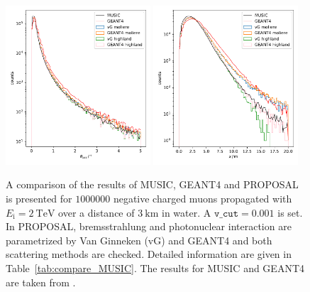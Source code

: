 \documentclass[pdflatex, sn-mathphys]{sn-jnl}%
\theoremstyle{thmstyleone}%
\theoremstyle{thmstyletwo}%
\theoremstyle{thmstylethree}%
\begin{document}
\begin{figure}
    \centering
        {\includegraphics[width=0.48\textwidth]{../../deflection/plots/FINAL/2TeV_1e6events_accumulated_defl_only3km_5deg_paper.pdf}}
        {\includegraphics[width=0.48\textwidth]{../../deflection/plots/FINAL/2TeV_1e6events_distance_showeraxis_only3km_20m_paper.pdf}}
    \caption{A comparison of the results of MUSIC, GEANT4 and PROPOSAL is presented for $\num{1000000}$ negative charged muons propagated with 
    $E_{\text{i}} = \SI{2}{\tera\electronvolt}$ over a distance of 
    $\SI{3}{\kilo\meter}$ in water. A $\texttt{v\_cut} = 0.001$ is set. In PROPOSAL, 
    bremsstrahlung and photonuclear interaction are parametrized by 
    Van Ginneken (vG) and GEANT4 and both scattering methods are checked. Detailed information are given in 
    Table~\ref{tab:compare_MUSIC}. The results for MUSIC and GEANT4 are taken from 
    \cite{comparison_MUSIC_GEANT4_2009}.}
    \label{fig:compare_MUSIC}
\end{figure}
\end{document}
